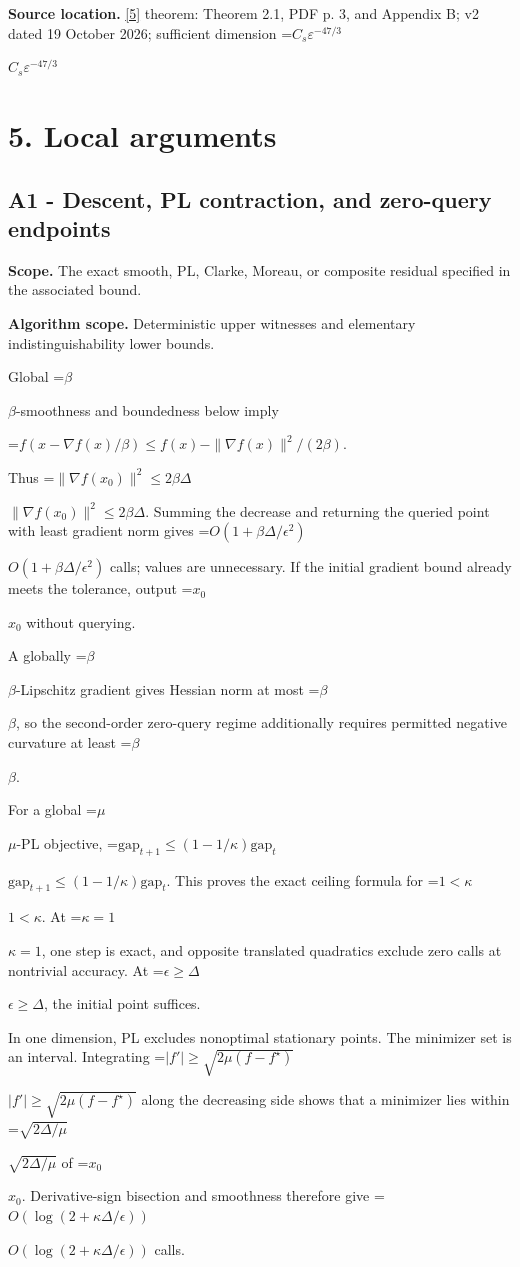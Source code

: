 \documentclass[10pt,a4paper]{article}
\newcommand{\AtlasMath}[1]{\par\begingroup\centering\setbox0=\hbox{$\displaystyle #1$}\ifdim\wd0>1.4\linewidth\typeout{ATLAS WIDE FORMULA: \the\wd0}\fi\ifdim\wd0>\linewidth\resizebox{\linewidth}{!}{\box0}\else\box0\fi\par\endgroup}
\newcommand{\AtlasInlineMath}[1]{\begingroup\setbox0=\hbox{$#1$}\ifdim\wd0>.4\linewidth\endgroup\AtlasMath{#1}\else\endgroup$#1$\fi}
\begin{document}
\textbf{Source location.} \href{https://arxiv.org/pdf/2610.17074v2}{[5]} theorem: Theorem 2.1, PDF p. 3, and Appendix B; v2 dated 19 October 2026; sufficient dimension \AtlasInlineMath{C_s\varepsilon^{-47/3}}

\section{5. Local arguments}
\subsection{A1 - Descent, PL contraction, and zero-query endpoints}
\textbf{Scope.} The exact smooth, PL, Clarke, Moreau, or composite residual specified in the associated bound.

\textbf{Algorithm scope.} Deterministic upper witnesses and elementary indistinguishability lower bounds.

Global \AtlasInlineMath{\beta}-smoothness and boundedness below imply

\AtlasMath{f(x-\nabla f(x)/\beta)\le f(x)-\|\nabla f(x)\|^2/(2\beta).}

Thus \AtlasInlineMath{\|\nabla f(x_0)\|^2\le2\beta\Delta}. Summing the decrease and returning the queried point with least gradient norm gives \AtlasInlineMath{O(1+\beta\Delta/\epsilon^2)} calls; values are unnecessary. If the initial gradient bound already meets the tolerance, output \AtlasInlineMath{x_0} without querying.

A globally \AtlasInlineMath{\beta}-Lipschitz gradient gives Hessian norm at most \AtlasInlineMath{\beta}, so the second-order zero-query regime additionally requires permitted negative curvature at least \AtlasInlineMath{\beta}.

For a global \AtlasInlineMath{\mu}-PL objective,
\AtlasInlineMath{\mathrm{gap}_{t+1}\le(1-1/\kappa)\mathrm{gap}_t}.
This proves the exact ceiling formula for \AtlasInlineMath{1<\kappa}. At \AtlasInlineMath{\kappa=1}, one step is exact, and opposite translated quadratics exclude zero calls at nontrivial accuracy. At \AtlasInlineMath{\epsilon\ge\Delta}, the initial point suffices.

In one dimension, PL excludes nonoptimal stationary points. The minimizer set is an interval. Integrating
\AtlasInlineMath{|f'|\ge\sqrt{2\mu(f-f^\star)}}
along the decreasing side shows that a minimizer lies within \AtlasInlineMath{\sqrt{2\Delta/\mu}} of \AtlasInlineMath{x_0}. Derivative-sign bisection and smoothness therefore give \AtlasInlineMath{O(\log(2+\kappa\Delta/\epsilon))} calls.
\end{document}
